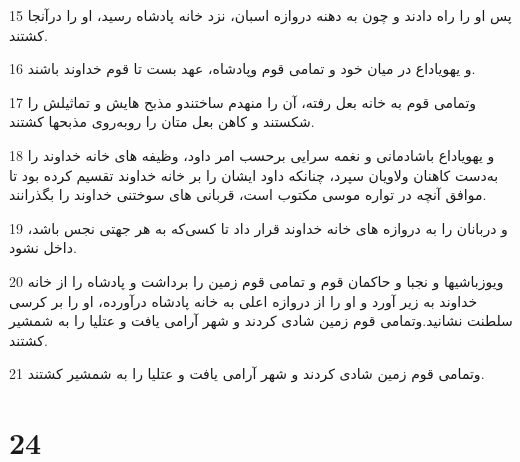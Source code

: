 \par 15 پس او را راه دادند و چون به دهنه دروازه اسبان، نزد خانه پادشاه رسید، او را درآنجا کشتند.
\par 16 و یهویاداع در میان خود و تمامی قوم وپادشاه، عهد بست تا قوم خداوند باشند.
\par 17 وتمامی قوم به خانه بعل رفته، آن را منهدم ساختندو مذبح هایش و تماثیلش را شکستند و کاهن بعل متان را روبه‌روی مذبحها کشتند.
\par 18 و یهویاداع باشادمانی و نغمه سرایی برحسب امر داود، وظیفه های خانه خداوند را به‌دست کاهنان ولاویان سپرد، چنانکه داود ایشان را بر خانه خداوند تقسیم کرده بود تا موافق آنچه در تواره موسی مکتوب است، قربانی های سوختنی خداوند را بگذرانند.
\par 19 و دربانان را به دروازه های خانه خداوند قرار داد تا کسی‌که به هر جهتی نجس باشد، داخل نشود.
\par 20 ویوزباشیها و نجبا و حاکمان قوم و تمامی قوم زمین را برداشت و پادشاه را از خانه خداوند به زیر آورد و او را از دروازه اعلی به خانه پادشاه درآورده، او را بر کرسی سلطنت نشانید.وتمامی قوم زمین شادی کردند و شهر آرامی یافت و عتلیا را به شمشیر کشتند.
\par 21 وتمامی قوم زمین شادی کردند و شهر آرامی یافت و عتلیا را به شمشیر کشتند.
 
\chapter{24}

